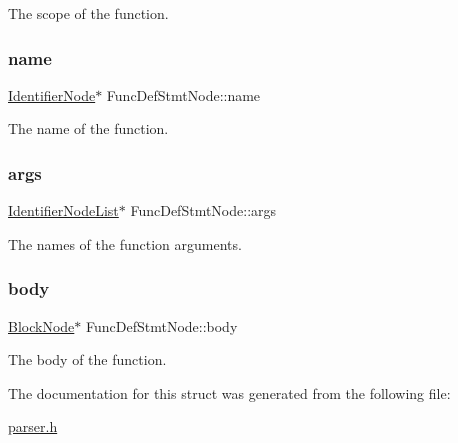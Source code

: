 The scope of the function. \mbox{\label{struct_func_def_stmt_node_ab047936127219724532e25ba6890265a}} 
\subsubsection{\texorpdfstring{name}{name}}
{\footnotesize\ttfamily \hyperlink{parser_8h_a930727769b8a8eb0d24d474f3aa12a43}{Identifier\+Node}$\ast$ Func\+Def\+Stmt\+Node\+::name}

The name of the function. \mbox{\label{struct_func_def_stmt_node_a2a9f4d580b7252e5576873d2252a187a}} 
\subsubsection{\texorpdfstring{args}{args}}
{\footnotesize\ttfamily \hyperlink{struct_identifier_node_list}{Identifier\+Node\+List}$\ast$ Func\+Def\+Stmt\+Node\+::args}

The names of the function arguments. \mbox{\label{struct_func_def_stmt_node_a9e50b6a41f7abe43b433fe4fd714b002}} 
\subsubsection{\texorpdfstring{body}{body}}
{\footnotesize\ttfamily \hyperlink{struct_block_node}{Block\+Node}$\ast$ Func\+Def\+Stmt\+Node\+::body}

The body of the function. 

The documentation for this struct was generated from the following file\+:\begin{DoxyCompactItemize}
\item 
\hyperlink{parser_8h}{parser.\+h}\end{DoxyCompactItemize}
